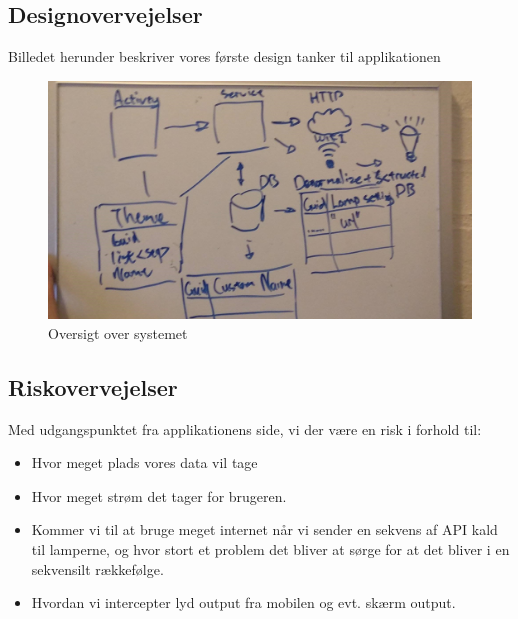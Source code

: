 		
		
		
			
		\subsection{Designovervejelser}
		Billedet herunder beskriver vores første design tanker til applikationen
		\begin{figure}[H]
			\centering
			\includegraphics[width=0.5\linewidth]{Kravspecifikation/Designovervejelser}
			\caption{Oversigt over systemet}
			\label{fig:Designovervejelser}
		\end{figure}
		\newpage
	
		\subsection{Riskovervejelser}
		Med udgangspunktet fra applikationens side, vi der være en risk i forhold til:
		\begin{itemize}
			\item Hvor meget plads vores data vil tage
			\item Hvor meget strøm det tager for brugeren. 
			\item Kommer vi til at bruge meget internet når vi sender en sekvens af API kald til lamperne, og hvor stort et problem det bliver at sørge for at det bliver i en sekvensilt rækkefølge.
			\item Hvordan vi intercepter lyd output fra mobilen og evt. skærm output. \newline
		\end{itemize}	
	
